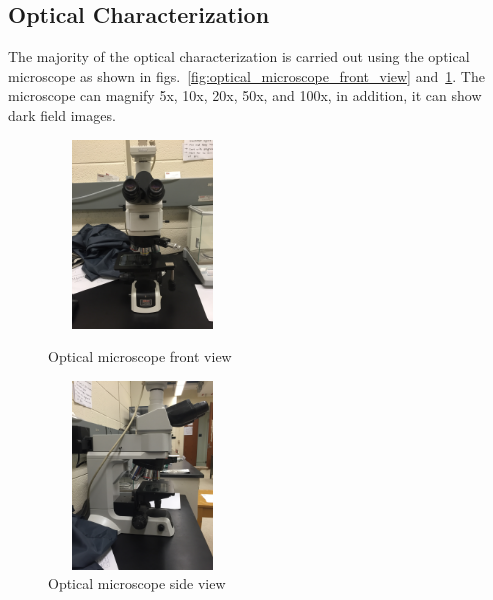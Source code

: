 \subsection{Optical Characterization}\label{subsec:characterization_optical}
The majority of the optical characterization is carried out using the optical microscope as shown in figs.~\ref{fig:optical_microscope_front_view} and~\ref{fig:optical_microscope_side_view}. The microscope can magnify 5x, 10x, 20x, 50x, and 100x, in addition, it can show dark field images.
\begin{figure}[ht]
	\centering
	\begin{minipage}[b]{0.45\linewidth}
		\centering
		\includegraphics[height=5cm,width=5cm]{figs/experimental/optical_microscope_front_view}
		\caption[Optical microscope front view]{Optical microscope front view}
		\label{fig:optical_microscope_front_view}
	\end{minipage}
	\qquad
	\begin{minipage}[b]{0.45\linewidth}
		\centering
		\includegraphics[height=5cm,width=5cm]{figs/experimental/optical_microscope_side_view}
		\caption[Optical microscope side view]{Optical microscope side view}
		\label{fig:optical_microscope_side_view}
	\end{minipage}
\end{figure}

